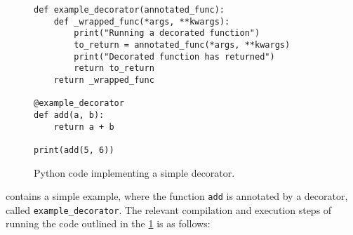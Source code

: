 \begin{figure}[h]\label{decorator_simple_explanation}
    \begin{center}
        \begin{lstlisting}
def example_decorator(annotated_func):
    def _wrapped_func(*args, **kwargs):
        print("Running a decorated function")
        to_return = annotated_func(*args, **kwargs)
        print("Decorated function has returned")
        return to_return
    return _wrapped_func

@example_decorator
def add(a, b):
    return a + b

print(add(5, 6))
        \end{lstlisting}
    \end{center}
    \caption{Python code implementing a simple decorator.}
\end{figure}


 contains a simple example, where the
function \lstinline{add} is annotated by a decorator, called
\lstinline{example_decorator}. The relevant compilation and execution steps of
running the code outlined in the \cref{decorator_simple_explanation} is as
follows:

